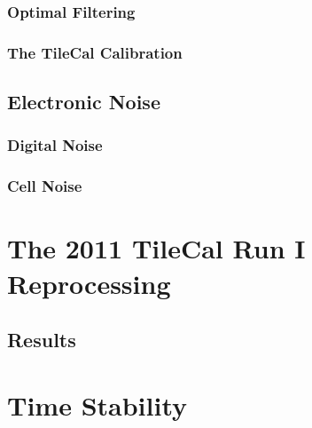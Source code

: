 \documentclass[10pt,twoside,cucitura,classica,english,openany]{toptesi}
\begin{document}


\subsubsection{Optimal Filtering}
\label{sec:optimal-filtering}



\subsubsection{The TileCal Calibration}
\label{sec:tilecal-calibration}



\subsection{Electronic Noise}
\label{sec:electronic-noise}



\subsubsection{Digital Noise}
\label{sec:digital-noise}



\subsubsection{Cell Noise}
\label{sec:cell-noise}



\section{The 2011 TileCal Run I Reprocessing}
\label{sec:2011-tilecal-run}



\subsection{Results}
\label{sec:results-1}



\section{Time Stability}
\label{sec:time-stability}
\end{document}
